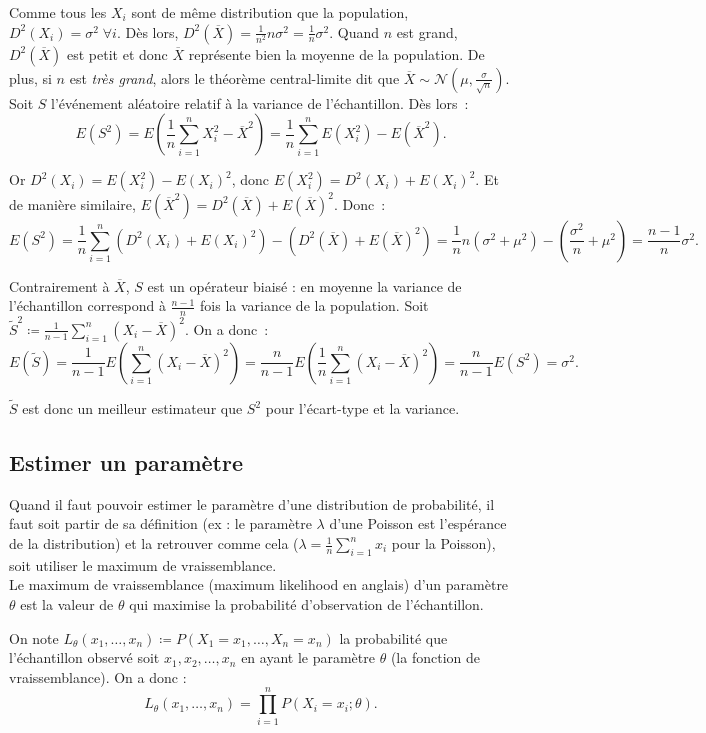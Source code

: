 \documentclass{article}
\begin{document}
		Comme tous les $X_i$ sont de même distribution que la population, $D^2(X_i) = \sigma^2 \;\forall i$. Dès lors, $D^2(\overline X) = \frac 1{n^2}n\sigma^2
		= \frac 1n\sigma^2$. Quand $n$ est grand, $D^2(\overline X)$ est petit et donc $\overline X$ représente bien la moyenne de la population. De plus, si $n$ est
		\textit{très grand}, alors le théorème central-limite dit que $\overline X \sim \mathcal N\left(\mu, \frac \sigma{\sqrt n}\right)$. Soit $S$ l'événement
		aléatoire relatif à la variance de l'échantillon. Dès lors~:
		\[E(S^2) = E\left(\frac 1n\sum_{i=1}^nX_i^2-\overline X^2\right) = \frac 1n\sum_{i=1}^nE(X_i^2) - E(\overline X^2).\]

		Or $D^2(X_i) = E(X_i^2) - E(X_i)^2$, donc $E(X_i^2) = D^2(X_i) + E(X_i)^2$. Et de manière similaire, $E(\overline X^2) = D^2(\overline X) + E(\overline X)^2$.
		Donc~:
		\[E(S^2) = \frac 1n\sum_{i=1}^n(D^2(X_i) + E(X_i)^2) - (D^2(\overline X) + E(\overline X)^2) = \frac 1nn(\sigma^2 + \mu^2) - (\frac {\sigma^2}n + \mu^2)
			= \frac {n-1}n\sigma^2.\]

		Contrairement à $\overline X$, $S$ est un opérateur biaisé : en moyenne la variance de l'échantillon correspond à $\frac {n-1}n$ fois la variance de la
		population. Soit $\widetilde S^2 \coloneqq \frac 1{n-1} \sum_{i=1}^n(X_i-\overline X)^2$. On a donc~:
		\[E(\widetilde S) = \frac 1{n-1}E\left(\sum_{i=1}^n(X_i-\overline X)^2\right) = \frac n{n-1}E\left(\frac 1n\sum_{i=1}^n(X_i-\overline X)^2\right)
			= \frac n{n-1}E(S^2) = \sigma^2.\]

		$\widetilde S$ est donc un meilleur estimateur que $S^2$ pour l'écart-type et la variance.

	\subsection{Estimer un paramètre}
		Quand il faut pouvoir estimer le paramètre d'une distribution de probabilité, il faut soit partir de sa définition (ex : le paramètre $\lambda$ d'une Poisson
		est l'espérance de la distribution) et la retrouver comme cela ($\lambda = \frac 1n\sum_{i=1}^nx_i$ pour la Poisson), soit utiliser le maximum de
		vraissemblance. \\ Le maximum de vraissemblance (maximum likelihood en anglais) d'un paramètre $\theta$ est la valeur de $\theta$ qui maximise la probabilité
		d'observation de l'échantillon.

		On note $L_\theta(x_1, \ldots, x_n) \coloneqq P(X_1=x_1, \ldots, X_n=x_n)$ la probabilité que l'échantillon observé soit $x_1, x_2, \ldots, x_n$ en ayant le
		paramètre $\theta$ (la fonction de vraissemblance). On a donc :
		\[L_\theta(x_1, \ldots, x_n) = \prod_{i=1}^nP(X_i=x_i ; \theta).\]
\end{document}
